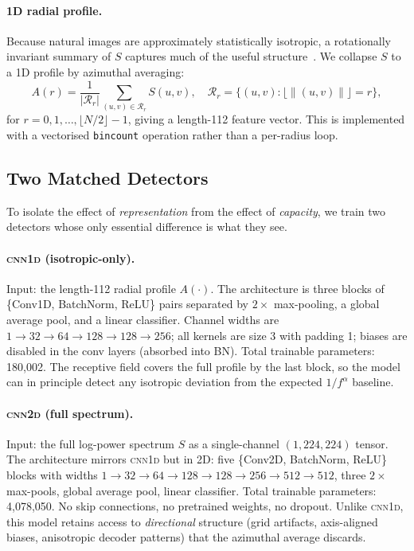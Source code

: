 \paragraph{1D radial profile.}
Because natural images are approximately statistically isotropic, a rotationally invariant summary of $S$ captures much of the useful structure~\cite{vanderschaaf1996,durall2020watch}. We collapse $S$ to a 1D profile by azimuthal averaging:
\begin{equation}
    A(r) = \frac{1}{|\mathcal{R}_r|}\!\!\sum_{(u,v)\in\mathcal{R}_r}\!\! S(u,v),
    \quad \mathcal{R}_r = \bigl\{(u,v) : \lfloor\lVert(u,v)\rVert\rfloor = r\bigr\},
    \label{eq:azavg}
\end{equation}
for $r = 0, 1, \ldots, \lfloor N/2 \rfloor - 1$, giving a length-112 feature vector. This is implemented with a vectorised \texttt{bincount} operation rather than a per-radius loop.

\subsection{Two Matched Detectors}
\label{sec:models}

To isolate the effect of \emph{representation} from the effect of \emph{capacity}, we train two detectors whose only essential difference is what they see.

\paragraph{\textsc{cnn1d} (isotropic-only).} Input: the length-112 radial profile $A(\cdot)$. The architecture is three blocks of \{Conv1D, BatchNorm, ReLU\} pairs separated by $2\times$ max-pooling, a global average pool, and a linear classifier. Channel widths are $1\!\to\!32\!\to\!64\!\to\!128\!\to\!128\!\to\!256$; all kernels are size 3 with padding 1; biases are disabled in the conv layers (absorbed into BN). Total trainable parameters: 180,002. The receptive field covers the full profile by the last block, so the model can in principle detect any isotropic deviation from the expected $1/f^{\alpha}$ baseline.

\paragraph{\textsc{cnn2d} (full spectrum).} Input: the full log-power spectrum $S$ as a single-channel $(1, 224, 224)$ tensor. The architecture mirrors \textsc{cnn1d} but in 2D: five \{Conv2D, BatchNorm, ReLU\} blocks with widths $1\!\to\!32\!\to\!64\!\to\!128\!\to\!128\!\to\!256\!\to\!512\!\to\!512$, three $2\times$ max-pools, global average pool, linear classifier. Total trainable parameters: 4,078,050. No skip connections, no pretrained weights, no dropout. Unlike \textsc{cnn1d}, this model retains access to \emph{directional} structure (grid artifacts, axis-aligned biases, anisotropic decoder patterns) that the azimuthal average discards.

